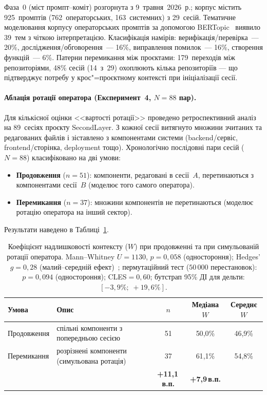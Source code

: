 \documentclass[11pt]{article}
\begin{document}
Фаза~0 (міст промпт--коміт) розгорнута з 9~травня~2026~р.; корпус містить 925~промптів (762~операторських, 163~системних) з 29~сесій.
Тематичне моделювання корпусу операторських промптів за допомогою BERTopic~\citep{grootendorst2022bertopic} виявило 39~тем з чіткою інтерпретацією.
Класифікація намірів: верифікація/перевірка~--- 20\%, дослідження/обговорення~--- 16\%, виправлення помилок~--- 16\%, створення функцій~--- 6\%.
Патерни перемикання між проєктами: 179~переходів між репозиторіями, 48\% сесій (14~з~29) охоплюють кілька репозиторіїв --- що підтверджує потребу у крос"=проєктному контексті при ініціалізації сесії.

\paragraph{Аблація ротації оператора (Експеримент~4, $N{=}88$ пар).}
Для кількісної оцінки <<вартості ротації>> проведено ретроспективний аналіз на 89~сесіях проєкту SecondLayer.
З кожної сесії витягнуто множини зчитаних та редагованих файлів і зіставлено з компонентами системи (backend/сервіс, frontend/сторінка, deployment тощо).
Хронологічно послідовні пари сесій ($N{=}88$) класифіковано на дві умови:
\begin{itemize}[nosep]
  \item \textbf{Продовження} ($n{=}51$): компоненти, редаговані в сесії~$A$, перетинаються з компонентами сесії~$B$ (моделює того самого оператора).
  \item \textbf{Перемикання} ($n{=}37$): множини компонентів не перетинаються (моделює ротацію оператора на інший сектор).
\end{itemize}

\noindent Результати наведено в Таблиці~\ref{tab:rotation}.

\begin{table}[ht]
\centering
\small
\begin{tabularx}{\textwidth}{@{}l X c c c@{}}
\toprule
\textbf{Умова} & \textbf{Опис} & $n$ & \textbf{Медіана $W$} & \textbf{Середнє $W$} \\
\midrule
Продовження & спільні компоненти з попередньою сесією & 51 & 50{,}0\% & 46{,}9\% \\
Перемикання & розрізнені компоненти (симульована ротація) & 37 & 61{,}1\% & 54{,}8\% \\
\addlinespace
\multicolumn{2}{@{}l}{\textbf{Дельта ротації}} & & \textbf{+11{,}1\,в.п.} & \textbf{+7{,}9\,в.п.} \\
\bottomrule
\end{tabularx}
\caption{Коефіцієнт надлишковості контексту ($W$) при продовженні та при симульованій ротації оператора.
  Mann--Whitney $U{=}1130$, $p{=}0{,}058$ (одностороння); Hedges' $g{=}0{,}28$ (малий--середній ефект)~\citep{hedges1981distribution};
  пермутаційний тест ($50\,000$ перестановок): $p{=}0{,}094$ (одностороння);
  CLES${=}0{,}60$;
  бутстрап 95\% ДІ для дельти: $[-3{,}9\%;\; +19{,}6\%]$.}
\label{tab:rotation}
\end{table}
\end{document}
